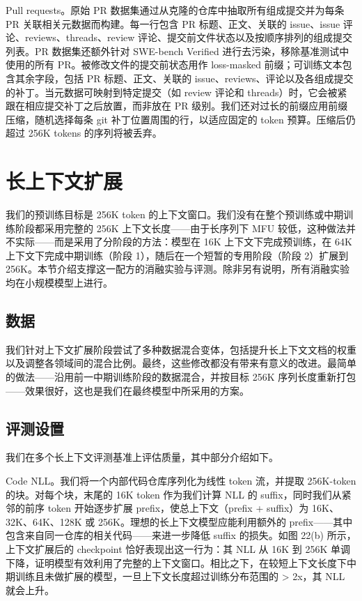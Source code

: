 \documentclass[
  10
]{article}
\begin{document}
Pull requests。原始 PR 数据集通过从克隆的仓库中抽取所有组成提交并为每条 PR 关联相关元数据而构建。每一行包含 PR 标题、正文、关联的 issue、issue 评论、reviews、threads、review 评论、提交前文件状态以及按顺序排列的组成提交列表。PR 数据集还额外针对 SWE-bench Verified 进行去污染，移除基准测试中使用的所有 PR。被修改文件的提交前状态用作 loss-masked 前缀；可训练文本包含其余字段，包括 PR 标题、正文、关联的 issue、reviews、评论以及各组成提交的补丁。当元数据可映射到特定提交（如 review 评论和 threads）时，它会被紧跟在相应提交补丁之后放置，而非放在 PR 级别。我们还对过长的前缀应用前缀压缩，随机选择每条 git 补丁位置周围的行，以适应固定的 token 预算。压缩后仍超过 256K tokens 的序列将被丢弃。

\section{长上下文扩展}\label{c-long-context-extension}

我们的预训练目标是 256K token 的上下文窗口。我们没有在整个预训练或中期训练阶段都采用完整的 256K 上下文长度——由于长序列下 MFU 较低，这种做法并不实际——而是采用了分阶段的方法：模型在 16K 上下文下完成预训练，在 64K 上下文下完成中期训练（阶段 1），随后在一个短暂的专用阶段（阶段 2）扩展到 256K。本节介绍支撑这一配方的消融实验与评测。除非另有说明，所有消融实验均在小规模模型上进行。



\subsection{数据}\label{c.1-data}

我们针对上下文扩展阶段尝试了多种数据混合变体，包括提升长上下文文档的权重以及调整各领域间的混合比例。最终，这些修改都没有带来有意义的改进。最简单的做法——沿用前一中期训练阶段的数据混合，并按目标 256K 序列长度重新打包——效果很好，这也是我们在最终模型中所采用的方案。

\subsection{评测设置}\label{c.2-evaluation-setup}

我们在多个长上下文评测基准上评估质量，其中部分介绍如下。

Code NLL。我们将一个内部代码仓库序列化为线性 token 流，并提取 256K-token 的块。对每个块，末尾的 16K token 作为我们计算 NLL 的 suffix，同时我们从紧邻的前序 token 开始逐步扩展 prefix，使总上下文（prefix + suffix）为 16K、32K、64K、128K 或 256K。理想的长上下文模型应能利用额外的 prefix——其中包含来自同一仓库的相关代码——来进一步降低 suffix 的损失。如图 22(b) 所示，上下文扩展后的 checkpoint 恰好表现出这一行为：其 NLL 从 16K 到 256K 单调下降，证明模型有效利用了完整的上下文窗口。相比之下，在较短上下文长度下中期训练且未做扩展的模型，一旦上下文长度超过训练分布范围的 >{} 2x，其 NLL 就会上升。
\end{document}
